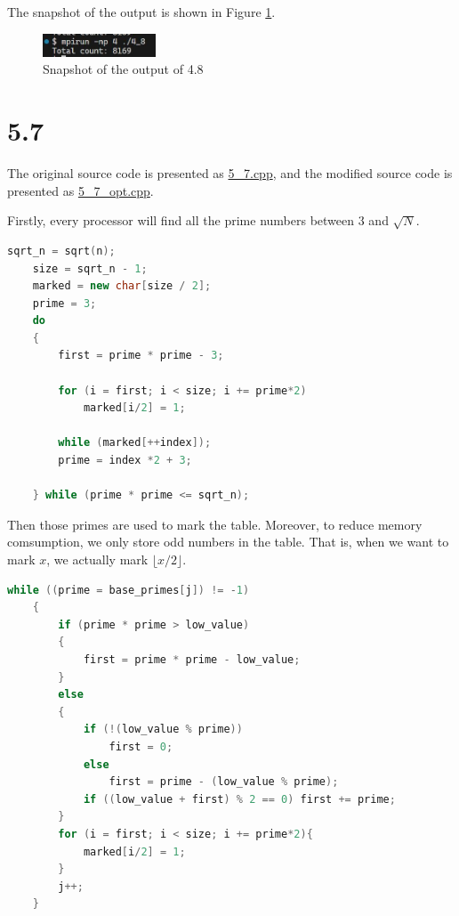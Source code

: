 The snapshot of the output is shown in Figure \ref{fig:4_8}.

\begin{figure}[H]
    \centering
    \includegraphics[width=0.3\textwidth]{fig-4.8.jpg}
    \caption{Snapshot of the output of 4.8}
    \label{fig:4_8}
\end{figure}

\section*{5.7}

The original source code is presented as \href{run:./5_7.cpp}{5\_7.cpp}, and the modified source code is presented as \href{run:./5_7_opt.cpp}{5\_7\_opt.cpp}.

Firstly, every processor will find all the prime numbers between $3$ and $\sqrt N$.

\begin{lstlisting}[language=C++]
    sqrt_n = sqrt(n);
    size = sqrt_n - 1;
    marked = new char[size / 2];
    prime = 3;
    do
    {
        first = prime * prime - 3;

        for (i = first; i < size; i += prime*2)
            marked[i/2] = 1;

        while (marked[++index]);
        prime = index *2 + 3;

    } while (prime * prime <= sqrt_n);
\end{lstlisting}

Then those primes are used to mark the table. Moreover, to reduce memory comsumption, we only store odd numbers in the table. That is, when we want to mark $x$, we actually mark $\lfloor x/2 \rfloor $.

\begin{lstlisting}[language=C++]
    while ((prime = base_primes[j]) != -1)
    {
        if (prime * prime > low_value)
        {
            first = prime * prime - low_value;
        }
        else 
        {
            if (!(low_value % prime))
                first = 0;
            else 
                first = prime - (low_value % prime);
            if ((low_value + first) % 2 == 0) first += prime;
        }
        for (i = first; i < size; i += prime*2){
            marked[i/2] = 1;
        }
        j++;
    }
\end{lstlisting}

